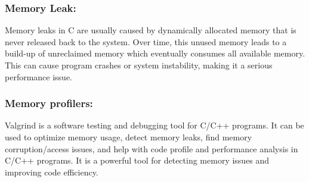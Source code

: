 \documentclass[titlepage]{article}
\begin{document}
    \subsubsection{Memory Leak:}
        Memory leaks in C are usually caused by dynamically allocated memory that is never released back to the system. Over time, this unused memory leads to a build-up of unreclaimed memory which eventually consumes all available memory. This can cause program crashes or system instability, making it a serious performance issue.
    \subsubsection{Memory profilers:}
        Valgrind is a software testing and debugging tool for C/C++ programs. It can be used to optimize memory usage, detect memory leaks, find memory corruption/access issues, and help with code profile and performance analysis in C/C++ programs. It is a powerful tool for detecting memory issues and improving code efficiency.
    
\end{document}
